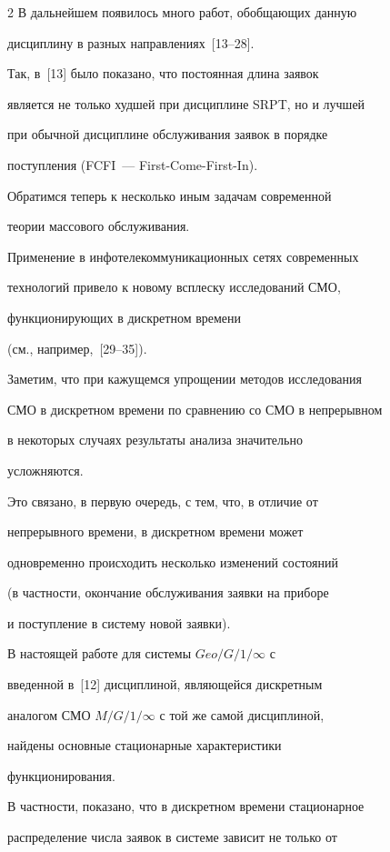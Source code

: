 \begin{multicols}{2}
В дальнейшем появилось много работ, обобщающих данную


дисциплину в разных направлениях~[13--28].


Так, в~[13] было показано, что постоянная длина заявок


является не только худшей при дисциплине SRPT, но и лучшей


при обычной дисциплине обслуживания заявок в порядке


поступления (FCFI~--- First-Come-First-In).





Обратимся теперь к несколько иным задачам современной


теории массового обслуживания.


Применение в инфотелекоммуникационных сетях современных


технологий привело к новому всплеску исследований СМО,


функционирующих в дискретном времени


(см., например,~[29--35]).


Заметим, что при кажущемся упрощении методов исследования


СМО в дискретном времени по сравнению со СМО в непрерывном


в некоторых случаях результаты анализа значительно


усложняются.


Это связано, в первую очередь, с тем, что, в отличие от


непрерывного времени, в дискретном времени может


одновременно происходить несколько изменений состояний


(в частности, окончание обслуживания заявки на приборе


и поступление в систему новой заявки).





В настоящей работе для системы $Geo/G/1/\infty$ с


введенной в~[12] дисциплиной, являющейся дискретным


аналогом СМО $M/G/1/\infty$ с той же самой дисциплиной,


найдены основные стационарные характеристики


функционирования.


В частности, показано, что в дискретном времени стационарное


распределение числа заявок в системе зависит не только от



\end{multicols}
